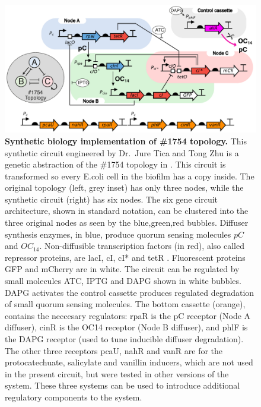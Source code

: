 \begin{figure}[H]
    \centering
    \includegraphics[width=1\textwidth]{chapters/Chapter 2/synthetic circuit2}
    \caption{\textbf{Synthetic biology implementation of \#1754 topology.} This synthetic circuit
    engineered by Dr.~Jure Tica and Tong Zhu is a genetic abstraction of the \#1754 topology in \cite{Scholes2019}.
    This circuit is transformed so every E.coli cell in the biofilm has a copy inside.
    The original topology (left, grey inset) has only three nodes, while the synthetic circuit (right) has six nodes.
    The six gene circuit architecture, shown in standard notation, can be clustered into the three original nodes
    as seen by the blue,green,red bubbles.
    Diffuser synthesis enzymes, in blue, produce quorum sensing molecules $pC$ and $OC_{14}$.
    Non-diffusible transcription
    factors (in red), also called repressor proteins, are lacI, cI, cI* and tetR .
    Fluorescent proteins GFP and mCherry are in white.
    The circuit can be regulated by small molecules ATC, IPTG and DAPG shown in white bubbles.
    DAPG activates the control cassette produces regulated degradation of small quorum sensing molecules.
    The bottom cassette (orange), contains the neccesary regulators:
    rpaR is the pC receptor (Node A diffuser), cinR is the OC14 receptor (Node B diffuser),
        and phlF is the DAPG receptor (used to tune inducible diffuser degradation).
    The other three receptors pcaU, nahR and vanR are for the protocatechuate, salicylate and vanillin inducers,
        which are not used in the present circuit, but were tested in other versions of the system.
    These three systems can be used to introduce additional regulatory components to the system. }
    \label{fig:synthetic circuit_chapter2}
\end{figure}

